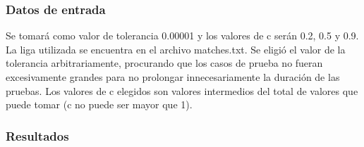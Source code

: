             \subsubsection*{Datos de entrada}
            Se tomará como valor de tolerancia 0.00001 y los valores de c serán 0.2, 0.5 y 0.9. La liga utilizada se encuentra en el archivo matches.txt. Se eligió el valor de la tolerancia arbitrariamente, procurando que los casos de prueba no fueran excesivamente grandes para no prolongar innecesariamente la duración de las pruebas. Los valores de c elegidos son valores intermedios del total de valores que puede tomar (c no puede ser mayor que 1).

            \subsubsection*{Resultados}
